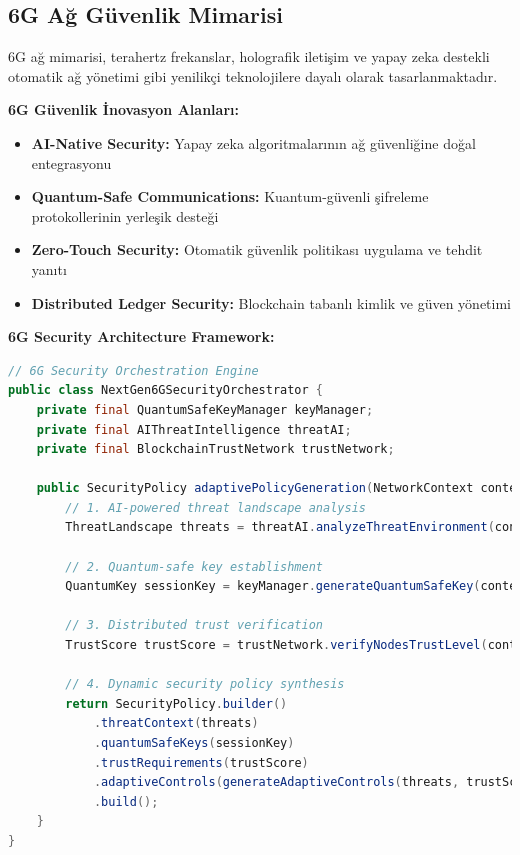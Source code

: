 \subsection{6G Ağ Güvenlik Mimarisi}

6G ağ mimarisi, terahertz frekanslar, holografik iletişim ve yapay zeka destekli otomatik ağ yönetimi gibi yenilikçi teknolojilere dayalı olarak tasarlanmaktadır.

\textbf{6G Güvenlik İnovasyon Alanları:}
\begin{itemize}
    \item \textbf{AI-Native Security:} Yapay zeka algoritmalarının ağ güvenliğine doğal entegrasyonu
    \item \textbf{Quantum-Safe Communications:} Kuantum-güvenli şifreleme protokollerinin yerleşik desteği
    \item \textbf{Zero-Touch Security:} Otomatik güvenlik politikası uygulama ve tehdit yanıtı
    \item \textbf{Distributed Ledger Security:} Blockchain tabanlı kimlik ve güven yönetimi
\end{itemize}

\textbf{6G Security Architecture Framework:}
\begin{lstlisting}[breaklines=true,basicstyle=\ttfamily\footnotesize,language=Java]
// 6G Security Orchestration Engine
public class NextGen6GSecurityOrchestrator {
    private final QuantumSafeKeyManager keyManager;
    private final AIThreatIntelligence threatAI;
    private final BlockchainTrustNetwork trustNetwork;
    
    public SecurityPolicy adaptivePolicyGeneration(NetworkContext context) {
        // 1. AI-powered threat landscape analysis
        ThreatLandscape threats = threatAI.analyzeThreatEnvironment(context);
        
        // 2. Quantum-safe key establishment
        QuantumKey sessionKey = keyManager.generateQuantumSafeKey(context.getNodes());
        
        // 3. Distributed trust verification
        TrustScore trustScore = trustNetwork.verifyNodesTrustLevel(context.getParticipants());
        
        // 4. Dynamic security policy synthesis
        return SecurityPolicy.builder()
            .threatContext(threats)
            .quantumSafeKeys(sessionKey)
            .trustRequirements(trustScore)
            .adaptiveControls(generateAdaptiveControls(threats, trustScore))
            .build();
    }
}
\end{lstlisting}

